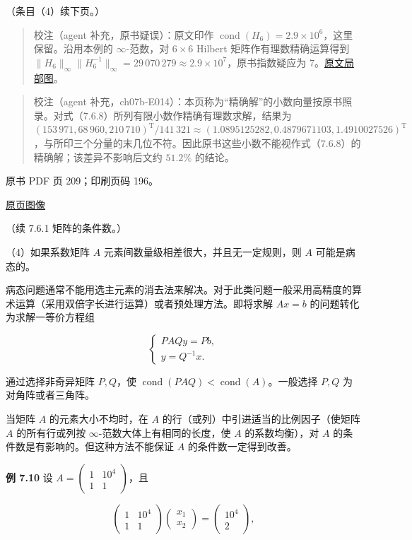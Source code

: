 （条目（4）续下页。）

\begin{quote}
校注（agent 补充，原书疑误）：原文印作 \(\operatorname{cond}(H_6)=2.9\times10^6\)，这里保留。沿用本例的 \(\infty\)-范数，对 \(6\times6\) Hilbert 矩阵作有理数精确运算得到 \(\|H_6\|_\infty\|H_6^{-1}\|_\infty=29\,070\,279\approx2.9\times10^7\)，原书指数疑应为 7。\href{verified/assets/ch07b/208-h6-cond.png}{原文局部图}。
\end{quote}

\begin{quote}
校注（agent 补充，ch07b-E014）：本页称为``精确解''的小数向量按原书照录。对式（7.6.8）所列有限小数作精确有理数求解，结果为 \((153\,971,68\,960,210\,710)^{\mathrm T}/141\,321\approx(1.0895125282,0.4879671103,1.4910027526)^{\mathrm T}\)，与所印三个分量的末几位不符。因此原书这些小数不能视作式（7.6.8）的精确解；该差异不影响后文约 \(51.2\%\) 的结论。
\end{quote}

\clearpage

原书 PDF 页 209；印刷页码 196。

\href{source-images/pdf-209.jpeg}{原页图像}

（续 7.6.1 矩阵的条件数。）

（4）如果系数矩阵 \(A\) 元素间数量级相差很大，并且无一定规则，则 \(A\) 可能是病态的。

病态问题通常不能用选主元素的消去法来解决。对于此类问题一般采用高精度的算术运算（采用双倍字长进行运算）或者预处理方法。即将求解 \(Ax=b\) 的问题转化为求解一等价方程组

\[
\begin{cases}
PAQy=Pb,\\
y=Q^{-1}x.
\end{cases}
\]

通过选择非奇异矩阵 \(P,Q\)，使 \(\operatorname{cond}(PAQ)<\operatorname{cond}(A)\)。一般选择 \(P,Q\) 为对角阵或者三角阵。

当矩阵 \(A\) 的元素大小不均时，在 \(A\) 的行（或列）中引进适当的比例因子（使矩阵 \(A\) 的所有行或列按 \(\infty\)-范数大体上有相同的长度，使 \(A\) 的系数均衡），对 \(A\) 的条件数是有影响的。但这种方法不能保证 \(A\) 的条件数一定得到改善。

\textbf{例 7.10} 设 \(A=\begin{pmatrix}1&10^4\\1&1\end{pmatrix}\)，且

\[
\begin{pmatrix}1&10^4\\1&1\end{pmatrix}
\begin{pmatrix}x_1\\x_2\end{pmatrix}
=\begin{pmatrix}10^4\\2\end{pmatrix},
\tag{7.6.9}
\]

